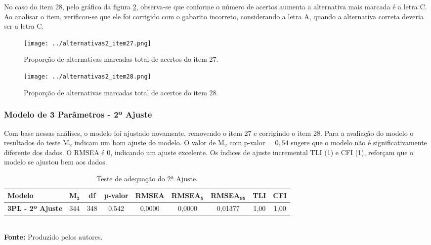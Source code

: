 	
No caso do item 28, pelo gráfico da figura \ref{fig:item_28}, observa-se que conforme o número de acertos aumenta a alternativa mais marcada é a letra C. Ao analisar o item, verificou-se que ele foi corrigido com o gabarito incorreto, considerando a letra A, quando a alternativa correta deveria ser a letra C. 

\begin{figure}[H]
	\centering
	\caption{Proporção de alternativas marcadas total de acertos do item 27.}
	\texttt{[image: ../alternativas2\_item27.png]}
	\parbox{\textwidth}{
		\centering %
	}
	\label{fig:item_27}
\end{figure}


\begin{figure}[H]
	\centering
	\caption{Proporção de alternativas marcadas total de acertos do item 28.}
	\texttt{[image: ../alternativas2\_item28.png]}
	\parbox{\textwidth}{
	\centering %
}	
	\label{fig:item_28}
\end{figure}




\subsubsection{Modelo de 3 Parâmetros - 2º Ajuste}

 Com base nessas análises, o modelo foi ajustado novamente, removendo o item 27 e corrigindo o item 28. Para a avaliação do modelo o resultados do teste M$_2$ indicam um bom ajuste do modelo. O valor de M$_2$ com p-valor = $0,54$ sugere que o modelo não é significativamente diferente dos dados. O RMSEA é 0, indicando um ajuste excelente. Os índices de ajuste incremental TLI (1) e CFI (1), reforçam que o modelo se ajustou bem aos dados.
 
\begin{table}[!htb]
	\centering
	\caption{Teste de adequação do 2ª Ajuste.}
	\label{tabela-m2-2}
	\begin{tabular}{lcccccccc}
		\hline
		\textbf{Modelo} & \textbf{M}$_\textbf{2}$ & \textbf{df} &\textbf{ p-valor} & \textbf{RMSEA} & \textbf{RMSEA$_\textbf{5}$} & \textbf{RMSEA$_{\textbf{95}}$} & \textbf{TLI} & \textbf{CFI} \\ 
		\hline 
		\textbf{3PL - 2º Ajuste} & 344 & 348 & 0,542 & 0,0000 & 0,0000 & 0,01377 & 1,00 & 1,00 \\ 
		\hline
	\end{tabular}\\
	\vspace*{0.5cm}
	\small{\textbf{Fonte:} Produzido pelos autores.}
\end{table}

